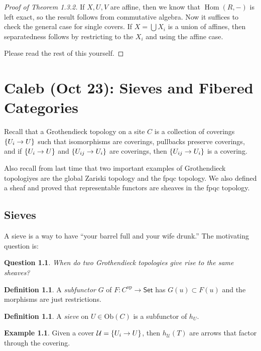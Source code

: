 \documentclass[leqno, openany]{memoir}
\newtheorem{quest}[thm]{Question}
\theoremstyle{definition}
\newtheorem{defn}[thm]{Definition}
\newtheorem{exm}[thm]{Example}
\theoremstyle{remark}
\theoremstyle{plain}
\theoremstyle{definition}
\theoremstyle{remark}
\newcommand{\mc}[1]{\mathcal{#1}}
\newcommand{\mr}[1]{\mathrm{#1}}
\newcommand{\ms}[1]{\mathsf{#1}}
\DeclareMathOperator{\Hom}{Hom}
\begin{document}
\begin{proof}[Proof of Theorem 1.3.2] If $X,U,V$ are affine, then we know that
    $\Hom(R,-)$ is left exact, so the result follows from commutative algebra.
    Now it suffices to check the general case for single covers. If $X =
    \bigcup X_i$ is a union of affines, then separatedness follows by
    restricting to the $X_i$ and using the affine case.

    Please read the rest of this yourself.  \end{proof}

\chapter{Caleb (Oct 23): Sieves and Fibered Categories}%
\label{cha:caleb_oct_23_sieves_and_fibered_categories}

Recall that a Grothendieck topology on a site $C$ is a collection of coverings
$\qty{U_i \to U}$ such that isomorphisms are coverings, pullbacks preserve
coverings, and if $\qty{U_i \to U}$ and $\qty{U_{ij} \to U_i}$ are coverings,
then $\qty{U_{ij} \to U_i}$ is a covering.

Also recall from last time that two important examples of Grothendieck
topologiyes are the global Zariski topology and the fpqc topology. We also
defined a sheaf and proved that representable functors are sheaves in the fpqc
topology.

\section{Sieves}%

A sieve is a way to have ``your barrel full and your wife drunk.'' The
motivating question is:

\begin{quest} When do two Grothendieck topologies give rise to the same
sheaves?  \end{quest}

\begin{defn} A \textit{subfunctor} $G$ of $F \colon C^{\mr{op}} \to \ms{Set}$
has $G(u) \subset F(u)$ and the morphisms are just restrictions.  \end{defn}

\begin{defn} A \textit{sieve} on $U \in \mr{Ob}(C)$ is a subfunctor of $h_U$.
\end{defn}

\begin{exm} Given a cover $\mc{U} = \qty{U_i \to U}$, then $h_{\mc{U}}(T)$ are
arrows that factor through the covering.  \end{exm}
\end{document}

